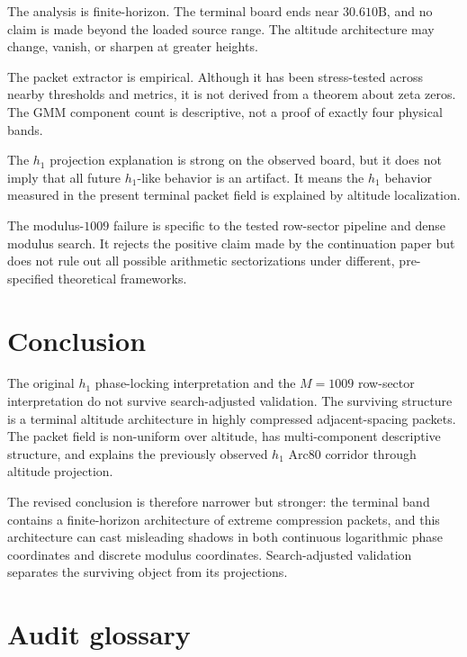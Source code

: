 \documentclass[11pt]{article}
\begin{document}
The analysis is finite-horizon. The terminal board ends near \(30.610\mathrm{B}\), and no claim is made beyond the loaded source range. The altitude architecture may change, vanish, or sharpen at greater heights.

The packet extractor is empirical. Although it has been stress-tested across nearby thresholds and metrics, it is not derived from a theorem about zeta zeros. The GMM component count is descriptive, not a proof of exactly four physical bands.

The \(h_1\) projection explanation is strong on the observed board, but it does not imply that all future \(h_1\)-like behavior is an artifact. It means the \(h_1\) behavior measured in the present terminal packet field is explained by altitude localization.

The modulus-\(1009\) failure is specific to the tested row-sector pipeline and dense modulus search. It rejects the positive claim made by the continuation paper but does not rule out all possible arithmetic sectorizations under different, pre-specified theoretical frameworks.

\section{Conclusion}

The original \(h_1\) phase-locking interpretation and the \(M=1009\) row-sector interpretation do not survive search-adjusted validation. The surviving structure is a terminal altitude architecture in highly compressed adjacent-spacing packets. The packet field is non-uniform over altitude, has multi-component descriptive structure, and explains the previously observed \(h_1\) Arc80 corridor through altitude projection.

The revised conclusion is therefore narrower but stronger: the terminal band contains a finite-horizon architecture of extreme compression packets, and this architecture can cast misleading shadows in both continuous logarithmic phase coordinates and discrete modulus coordinates. Search-adjusted validation separates the surviving object from its projections.

\appendix

\section{Audit glossary}
\end{document}
